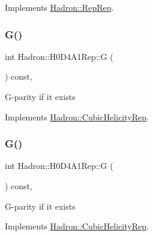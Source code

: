 Implements \mbox{\hyperlink{structHadron_1_1RepRep_a92c8802e5ed7afd7da43ccfd5b7cd92b}{Hadron\+::\+Rep\+Rep}}.

\mbox{\label{structHadron_1_1H0D4A1Rep_ab13ff026da1bc59df4b52835038296d5}} 
\subsubsection{\texorpdfstring{G()}{G()}\hspace{0.1cm}{\footnotesize\ttfamily [1/3]}}
{\footnotesize\ttfamily int Hadron\+::\+H0\+D4\+A1\+Rep\+::G (\begin{DoxyParamCaption}{ }\end{DoxyParamCaption}) const\hspace{0.3cm}{\ttfamily [inline]}, {\ttfamily [virtual]}}

G-\/parity if it exists 

Implements \mbox{\hyperlink{structHadron_1_1CubicHelicityRep_a50689f42be1e6170aa8cf6ad0597018b}{Hadron\+::\+Cubic\+Helicity\+Rep}}.

\mbox{\label{structHadron_1_1H0D4A1Rep_ab13ff026da1bc59df4b52835038296d5}} 
\subsubsection{\texorpdfstring{G()}{G()}\hspace{0.1cm}{\footnotesize\ttfamily [2/3]}}
{\footnotesize\ttfamily int Hadron\+::\+H0\+D4\+A1\+Rep\+::G (\begin{DoxyParamCaption}{ }\end{DoxyParamCaption}) const\hspace{0.3cm}{\ttfamily [inline]}, {\ttfamily [virtual]}}

G-\/parity if it exists 

Implements \mbox{\hyperlink{structHadron_1_1CubicHelicityRep_a50689f42be1e6170aa8cf6ad0597018b}{Hadron\+::\+Cubic\+Helicity\+Rep}}.

\mbox{\label{structHadron_1_1H0D4A1Rep_ab13ff026da1bc59df4b52835038296d5}} 
